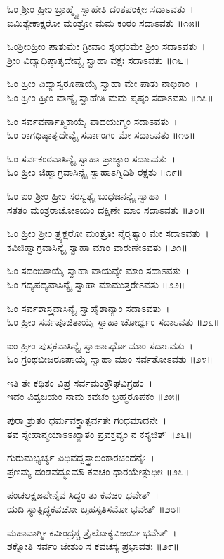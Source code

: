 ಓಂ ಶ್ರೀಂ ಹ್ರೀಂ ಬ್ರಾಹ್ಮ್ಯೈ ಸ್ವಾಹೇತಿ ದಂತಪಂಕ್ತೀಃ ಸದಾಽವತು~।\\
ಐಮಿತ್ಯೇಕಾಕ್ಷರೋ ಮಂತ್ರೋ ಮಮ ಕಂಠಂ ಸದಾಽವತು ॥೧೫॥

ಓಂಶ್ರೀಂಹ್ರೀಂ ಪಾತುಮೇ ಗ್ರೀವಾಂ ಸ್ಕಂಧಂಮೇ ಶ್ರೀಂ ಸದಾಽವತು~।\\
ಶ್ರೀಂ ವಿದ್ಯಾಧಿಷ್ಠಾತೃದೇವ್ಯೈ ಸ್ವಾಹಾ ವಕ್ಷಃ ಸದಾಽವತು ॥೧೬॥

ಓಂ ಹ್ರೀಂ ವಿದ್ಯಾಸ್ವರೂಪಾಯೈ ಸ್ವಾಹಾ ಮೇ ಪಾತು ನಾಭಿಕಾಂ~।\\
ಓಂ ಹ್ರೀಂ ಹ್ರೀಂ ವಾಣ್ಯೈ ಸ್ವಾಹೇತಿ ಮಮ ಪೃಷ್ಠಂ ಸದಾಽವತು ॥೧೭॥

ಓಂ ಸರ್ವವರ್ಣಾತ್ಮಿಕಾಯೈ ಪಾದಯುಗ್ಮಂ ಸದಾಽವತು~।\\
ಓಂ ರಾಗಧಿಷ್ಠಾತೃದೇವ್ಯೈ ಸರ್ವಾಂಗಂ ಮೇ ಸದಾಽವತು ॥೧೮॥

ಓಂ ಸರ್ವಕಂಠವಾಸಿನ್ಯೈ ಸ್ವಾಹಾ ಪ್ರಾಚ್ಯಾಂ ಸದಾಽವತು~।\\
ಓಂ ಹ್ರೀಂ ಜಿಹ್ವಾಗ್ರವಾಸಿನ್ಯೈ ಸ್ವಾಹಾಽಗ್ನಿದಿಶಿ ರಕ್ಷತು ॥೧೯॥

ಓಂ ಐಂ ಶ್ರೀಂ ಹ್ರೀಂ ಸರಸ್ವತ್ಯೈ ಬುಧಜನನ್ಯೈ ಸ್ವಾಹಾ~।\\
ಸತತಂ ಮಂತ್ರರಾಜೋಽಯಂ ದಕ್ಷಿಣೇ ಮಾಂ ಸದಾಽವತು ॥೨೦॥

ಓಂ ಹ್ರೀಂ ಶ್ರೀಂ ತ್ರ್ಯಕ್ಷರೋ ಮಂತ್ರೋ ನೈರೃತ್ಯಾಂ ಮೇ ಸದಾಽವತು~।\\
ಕವಿಜಿಹ್ವಾಗ್ರವಾಸಿನ್ಯೈ ಸ್ವಾಹಾ ಮಾಂ ವಾರುಣೇಽವತು ॥೨೧॥

ಓಂ ಸದಂಬಿಕಾಯೈ ಸ್ವಾಹಾ ವಾಯವ್ಯೇ ಮಾಂ ಸದಾಽವತು~।\\
ಓಂ ಗದ್ಯಪದ್ಯವಾಸಿನ್ಯೈ ಸ್ವಾಹಾ ಮಾಮುತ್ತರೇಽವತು ॥೨೨॥

ಓಂ ಸರ್ವಶಾಸ್ತ್ರವಾಸಿನ್ಯೈ ಸ್ವಾಹೈಶಾನ್ಯಾಂ ಸದಾಽವತು~।\\
ಓಂ ಹ್ರೀಂ ಸರ್ವಪೂಜಿತಾಯೈ ಸ್ವಾಹಾ ಚೋರ್ಧ್ವಂ ಸದಾಽವತು ॥೨೩॥

ಐಂ ಹ್ರೀಂ ಪುಸ್ತಕವಾಸಿನ್ಯೈ ಸ್ವಾಹಾಽಧೋ ಮಾಂ ಸದಾಽವತು~।\\
ಓಂ ಗ್ರಂಥಬೀಜರೂಪಾಯೈ ಸ್ವಾಹಾ ಮಾಂ ಸರ್ವತೋಽವತು ॥೨೪॥

ಇತಿ ತೇ ಕಥಿತಂ ವಿಪ್ರ ಸರ್ವಮಂತ್ರೌಘವಿಗ್ರಹಂ~।\\
ಇದಂ ವಿಶ್ವಜಯಂ ನಾಮ ಕವಚಂ ಬ್ರಹ್ಮರೂಪಕಂ ॥೨೫॥

ಪುರಾ ಶ್ರುತಂ ಧರ್ಮವಕ್ತ್ರಾತ್ಪರ್ವತೇ ಗಂಧಮಾದನೇ~।\\
ತವ ಸ್ನೇಹಾನ್ಮಯಾಽಽಖ್ಯಾತಂ ಪ್ರವಕ್ತವ್ಯಂ ನ ಕಸ್ಯಚಿತ್ ॥೨೬॥

ಗುರುಮಭ್ಯರ್ಚ್ಯ ವಿಧಿವದ್ವಸ್ತ್ರಾಲಂಕಾರಚಂದನೈಃ~।\\
ಪ್ರಣಮ್ಯ ದಂಡವದ್ಭೂಮೌ ಕವಚಂ ಧಾರಯೇತ್ಸುಧೀಃ ॥೨೭॥

ಪಂಚಲಕ್ಷಜಪೇನೈವ ಸಿದ್ಧಂ ತು ಕವಚಂ ಭವೇತ್~।\\
ಯದಿ ಸ್ಯಾತ್ಸಿದ್ಧಕವಚೋ ಬೃಹಸ್ಪತಿಸಮೋ ಭವೇತ್ ॥೨೮॥

ಮಹಾವಾಗ್ಮೀ ಕವೀಂದ್ರಶ್ಚ ತ್ರೈಲೋಕ್ಯವಿಜಯೀ ಭವೇತ್~।\\
ಶಕ್ನೋತಿ ಸರ್ವಂ ಜೇತುಂ ಸ ಕವಚಸ್ಯ ಪ್ರಭಾವತಃ ॥೨೯॥


